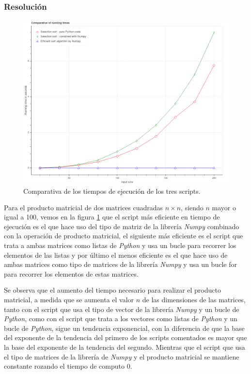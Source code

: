 \documentclass[12pt,twoside]{article}
\begin{document}
\subsubsection{Resolución}

\begin{figure}[hbt]
\begin{center}
	\includegraphics[width=1\textwidth]{41.png}
	\caption{Comparativa de los tiempos de ejecución de los tres scripts.}
	\label{fig:fig5}
\end{center}
\end{figure}

Para el producto matricial de dos matrices cuadradas $n \times n$, siendo $n$ mayor o igual a 100, vemos en la figura \ref{fig:fig5} que el script más eficiente en tiempo de ejecución es el que hace uso del tipo de matriz de la librería \textit{Numpy} combinado con la operación de producto matricial, el siguiente más eficiente es el script que trata a ambas matrices como listas de \textit{Python} y usa un bucle para recorrer los elementos de las listas y por último el menos eficiente es el que hace uso de ambas matrices como tipo de matrices de la librería \textit{Numpy} y usa un bucle for para recorrer los elementos de estas matrices.

Se observa que el aumento del tiempo necesario para realizar el producto matricial, a medida que se aumenta el valor $n$ de las dimensiones de las matrices, tanto con el script que usa el tipo de vector de la librería \textit{Numpy} y un bucle de \textit{Python}, como con el script que trata a los vectores como listas de \textit{Python} y un bucle de \textit{Python}, sigue un tendencia exponencial, con la diferencia de que la base del exponente de la tendencia del primero de los scripts comentados es mayor que la base del exponente de la tendencia del segundo. Mientras que el script que usa el tipo de matrices de la librería de \textit{Numpy} y el producto matricial se mantiene constante rozando el tiempo de computo 0.
\end{document}

